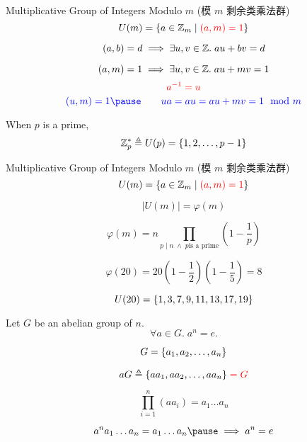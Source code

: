\begin{frame}
  \begin{exampleblock}{Multiplicative Group of Integers Modulo $m$ (模 $m$ 剩余类乘法群)}
    \[
      U(m) = \{a \in \mathbb{Z}_{m} \mid \textcolor{red}{(a, m) = 1}\}
    \]
  \end{exampleblock}

  \pause
  \vspace{0.60cm}
  \begin{theorem}
    \[
      (a, b) = d \implies \exists u, v \in \mathbb{Z}.\; au + bv = d
    \]
  \end{theorem}

  \pause
  \[
    (a, m) = 1 \implies \exists u, v \in \mathbb{Z}.\; au + mv = 1
  \]
  \pause
  \[
    \textcolor{red}{a^{-1} = u}
  \]
  \pause
  \[
    \blue{(u, m) = 1 \pause\qquad ua = au = au + mv = 1\mod{m}}
  \]
\end{frame}

\begin{frame}{}
  \begin{center}
    When $p$ is a prime,
    \[
      \mathbb{Z}^{\ast}_{p} \triangleq U(p) = \{1, 2, \dots, p-1\}
    \]
  \end{center}
\end{frame}

\begin{frame}
  \begin{exampleblock}{Multiplicative Group of Integers Modulo $m$ (模 $m$ 剩余类乘法群)}
    \[
      U(m) = \{a \in \mathbb{Z}_{m} \mid \textcolor{red}{(a, m) = 1}\}
    \]
  \end{exampleblock}

  \pause
  \[
    \big\lvert U(m) \big\rvert = \varphi(m)
  \]

  \pause
  \vspace{0.50cm}
  \begin{definition}
    \[
      \varphi(m) = n \prod_{p \mid n \;\land\; p \text{is a prime}}
        \left(1 - \frac{1}{p} \right)
    \]
  \end{definition}

  \pause
  \[
    \varphi(20) = 20 (1 - \frac{1}{2}) (1 - \frac{1}{5}) = 8
  \]

  \pause
  \[
    U(20) = \{1, 3, 7, 9, 11, 13, 17, 19\}
  \]
\end{frame}

\begin{frame}
  \begin{theorem}
    Let $G$ be an abelian group of  $n$.
    \[
      \forall a \in G.\; a^n = e.
    \]
  \end{theorem}

  \pause
  \[
    G = \{a_{1}, a_{2}, \dots, a_{n}\}
  \]

  \pause
  \[
    aG \triangleq \{aa_{1}, aa_{2}, \dots, aa_{n}\} \;\textcolor{red}{= G}
  \]

  \pause
  \[
    \prod_{i=1}^{n} (a a_i) = a_{1} \dots a_{n}
  \]

  \pause
  \[
    a^{n} a_{1} \dots a_{n} = a_{1} \dots a_{n} \pause \implies a^{n} = e
  \]
\end{frame}

